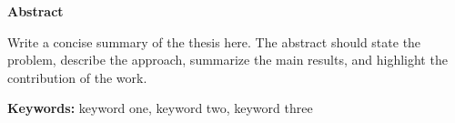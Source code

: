 \thispagestyle{plain}
\begin{center}
  {\LARGE\bfseries Abstract}
\end{center}

Write a concise summary of the thesis here. The abstract should state the
problem, describe the approach, summarize the main results, and highlight the
contribution of the work.

\textbf{Keywords:} keyword one, keyword two, keyword three
